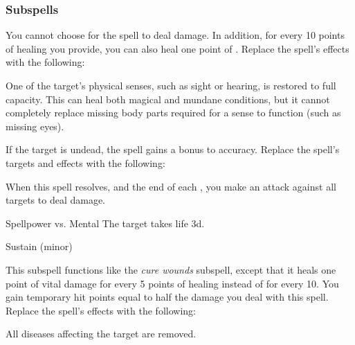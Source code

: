 \subsubsection{Subspells}
You cannot choose for the spell to deal damage.
In addition, for every 10 points of healing you provide, you can also heal one point of .
Replace the spell's effects with the following:
\begin{spellcontent}
\begin{augmenteffects}
\spelleffect
One of the target's physical senses, such as sight or hearing, is restored to full capacity.
This can heal both magical and mundane conditions, but it cannot completely replace missing body parts required for a sense to function (such as missing eyes).
\end{augmenteffects}
\end{spellcontent}
If the target is undead, the spell gains a  bonus to accuracy.
Replace the spell's targets and effects with the following:
\begin{spellcontent}
\begin{augmenttargetinginfo}
\end{augmenttargetinginfo}
\begin{augmenteffects}
\spelleffect
When this spell resolves, and the end of each , you make an attack against all targets to deal damage.
\begin{spellattack}{Spellpower vs. Mental}
\spellsuccess
The target takes life  \minus3d.
\end{spellattack}
\spelldur Sustain (minor)
\end{augmenteffects}
\end{spellcontent}
This subspell functions like the \textit{cure wounds} subspell, except that it heals one point of vital damage for every 5 points of healing instead of for every 10.
You gain temporary hit points equal to half the damage you deal with this spell.
Replace the spell's effects with the following:
\begin{spellcontent}
\begin{augmenteffects}
\spelleffect
All diseases affecting the target are removed.
\end{augmenteffects}
\end{spellcontent}
